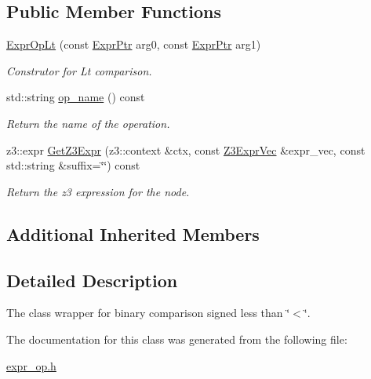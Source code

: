\subsection*{Public Member Functions}
\begin{DoxyCompactItemize}
\item 
\mbox{\label{classilang_1_1_expr_op_lt_a7c658dce132def5b91fa509c059349ca}} 
\mbox{\hyperlink{classilang_1_1_expr_op_lt_a7c658dce132def5b91fa509c059349ca}{Expr\+Op\+Lt}} (const \mbox{\hyperlink{classilang_1_1_expr_a85952b6a34620c4c8cab6bac9c9fdf8c}{Expr\+Ptr}} arg0, const \mbox{\hyperlink{classilang_1_1_expr_a85952b6a34620c4c8cab6bac9c9fdf8c}{Expr\+Ptr}} arg1)
\begin{DoxyCompactList}\small\item\em Construtor for Lt comparison. \end{DoxyCompactList}\item 
\mbox{\label{classilang_1_1_expr_op_lt_ad411d460d18f3f8996163c7f0457dc95}} 
std\+::string \mbox{\hyperlink{classilang_1_1_expr_op_lt_ad411d460d18f3f8996163c7f0457dc95}{op\+\_\+name}} () const
\begin{DoxyCompactList}\small\item\em Return the name of the operation. \end{DoxyCompactList}\item 
\mbox{\label{classilang_1_1_expr_op_lt_ae20f2afbb9426f6ae67eabc237909a25}} 
z3\+::expr \mbox{\hyperlink{classilang_1_1_expr_op_lt_ae20f2afbb9426f6ae67eabc237909a25}{Get\+Z3\+Expr}} (z3\+::context \&ctx, const \mbox{\hyperlink{namespaceilang_adc4eee919aa24fff882d03a48d733c19}{Z3\+Expr\+Vec}} \&expr\+\_\+vec, const std\+::string \&suffix=\char`\"{}\char`\"{}) const
\begin{DoxyCompactList}\small\item\em Return the z3 expression for the node. \end{DoxyCompactList}\end{DoxyCompactItemize}
\subsection*{Additional Inherited Members}


\subsection{Detailed Description}
The class wrapper for binary comparison signed less than \char`\"{}$<$\char`\"{}. 

The documentation for this class was generated from the following file\+:\begin{DoxyCompactItemize}
\item 
\mbox{\hyperlink{expr__op_8h}{expr\+\_\+op.\+h}}\end{DoxyCompactItemize}
